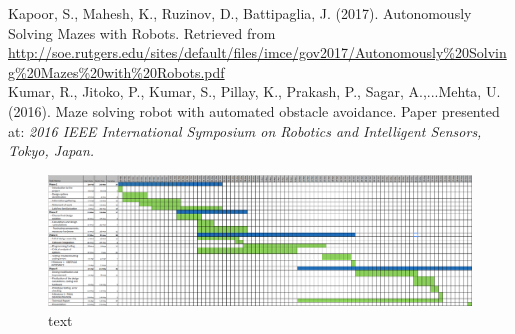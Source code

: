 \documentclass[a4paper]{article}
\begin{document}
Kapoor, S., Mahesh, K., Ruzinov, D., Battipaglia, J. (2017). Autonomously Solving Mazes with Robots. Retrieved from \small\url{http://soe.rutgers.edu/sites/default/files/imce/gov2017/Autonomously%20Solving%20Mazes%20with%20Robots.pdf}\\

Kumar, R., Jitoko, P., Kumar, S., Pillay, K., Prakash, P., Sagar, A.,...Mehta, U. (2016). Maze solving robot with automated obstacle avoidance. Paper presented at: \textit{2016 IEEE International Symposium on Robotics and Intelligent Sensors, Tokyo, Japan.}\\




\begin{figure}
\centering
\includegraphics[scale=0.38]{gantt}
\caption{text}
\end{figure}
\end{document}
